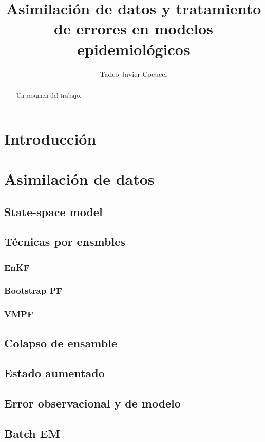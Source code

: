 \documentclass[11pt,a4paper]{article}
\title{Asimilación de datos y tratamiento de errores en modelos epidemiológicos}
\date{}
\author{Tadeo Javier Cocucci}
\begin{document}
\maketitle

\begin{abstract}
    Un resumen del trabajo.
\end{abstract}

\newpage
\tableofcontents

\section{Introducción}


\section{Asimilación de datos}
    
    \subsection{State-space model}
    \subsection{Técnicas por ensmbles}
        \subsubsection{EnKF}
        \subsubsection{Bootstrap PF}
        \subsubsection{VMPF}
    \subsection{Colapso de ensamble}
    \subsection{Estado aumentado}
    \subsection{Error observacional y de modelo}
    \subsection{Batch EM}
\end{document}
